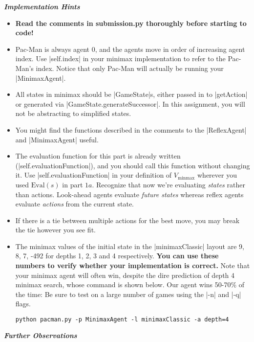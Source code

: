 {\bf {\em Implementation Hints}}
\begin{itemize}
  \item {\bf Read the comments in submission.py thoroughly before starting to
  code!}

  \item Pac-Man is always agent 0, and the agents move in order of increasing
  agent index. Use |self.index| in your minimax implementation to refer to the
  Pac-Man's index. Notice that only Pac-Man will actually be running your
  |MinimaxAgent|.

  \item All states in minimax should be |GameState|s, either passed in to
  |getAction| or generated via |GameState.generateSuccessor|. In this
  assignment, you will not be abstracting to simplified states.

  \item You might find the functions described in the comments to the
  |ReflexAgent| and |MinimaxAgent| useful.


  \item The evaluation function for this part is already written
  (|self.evaluationFunction|), and you should call this function without
  changing it. Use |self.evaluationFunction| in your definition of
  $V_\text{minmax}$ wherever you used $\text{Eval}(s)$ in part $1a$. Recognize
  that now we're evaluating {\em states} rather than actions. Look-ahead agents
  evaluate {\em future states} whereas reflex agents evaluate {\em actions} from
  the current state.

  \item If there is a tie between multiple actions for the best move, you may
  break the tie however you see fit.

  \item The minimax values of the initial state in the |minimaxClassic| layout
  are 9, 8, 7, -492 for depths 1, 2, 3 and 4 respectively. {\bf You can use
  these numbers to verify whether your implementation is correct.} Note that
  your minimax agent will often win, despite the dire prediction of depth 4
  minimax search, whose command is shown below. Our agent wins 50-70\% of the
  time: Be sure to test on a large number of games using the |-n| and |-q|
  flags.

  \begin{lstlisting}
python pacman.py -p MinimaxAgent -l minimaxClassic -a depth=4
\end{lstlisting}
\end{itemize}
{\em {\bf Further Observations}}

